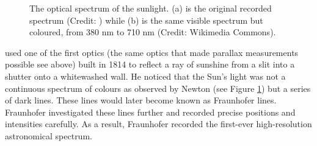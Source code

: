 \begin{figure}[!htb]
    \centering
    \vfill
    \vfill
    \caption{The optical spectrum of the sunlight. (a) is the original recorded spectrum (Credit: \citet{fraunhofer_first_1817}) while (b) is the same visible spectrum but coloured, from 380 nm to 710 nm (Credit: Wikimedia Commons).} 
    \label{fig:Fraunhofer_lines}
\end{figure}

\citet{fraunhofer_first_1817} used one of the first optics (the same optics that made parallax measurements possible see above) built in 1814 to reflect a ray of sunshine from a slit into a shutter onto a whitewashed wall. 
He noticed that the Sun's light was not a continuous spectrum of colours as observed by Newton \cite{newton_new_1993} 
(see Figure \ref{fig:Fraunhofer_lines}) but a series of dark lines. These lines would later become known as Fraunhofer 
lines. Fraunhofer investigated these lines further and recorded precise positions and intensities 
carefully. As a result, Fraunhofer recorded the first-ever high-resolution astronomical spectrum.

